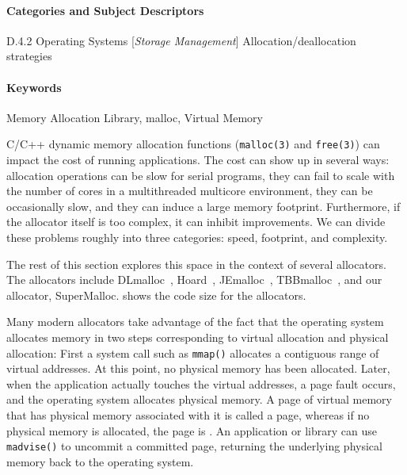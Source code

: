 \documentclass[natbib,sort&compress,10pt]{sigplanconf}
\newcommand{\code}[1]{\texttt{#1}}
\begin{document}
\paragraph{Categories and Subject Descriptors} D.4.2 Operating Systems [\textit{Storage Management}] Allocation/deallocation strategies

\paragraph{Keywords} Memory Allocation Library, malloc, Virtual Memory


C/C++ dynamic memory allocation functions (\code{malloc(3)} and
\code{free(3)}) can impact the cost of running applications.  The cost
can show up in several ways: allocation operations can be slow for
serial programs, they can fail to scale with the number of cores in a
multithreaded multicore environment, they can be occasionally slow,
and they can induce a large memory footprint.  Furthermore, if the
allocator itself is too complex, it can inhibit improvements.  We can
divide these problems roughly into three categories: speed, footprint,
and complexity. 

The rest of this section explores this space in the context of several
allocators.  The allocators include DLmalloc~\cite{Lea96},
Hoard~\cite{BergerMcBl00}, JEmalloc~\cite{Evans06},
TBBmalloc~\cite{KukanovVo07}, and our allocator, SuperMalloc.
 shows the code size for the allocators.

Many modern allocators take advantage of the fact that the operating
system allocates memory in two steps corresponding to virtual
allocation and physical allocation: First a system call such as
\code{mmap()} allocates a contiguous range of virtual addresses.  At
this point, no physical memory has been allocated.  Later, when the
application actually touches the virtual addresses, a page fault
occurs, and the operating system allocates physical memory.  A page of
virtual memory that has physical memory associated with it is called a
 page, whereas if no physical memory is allocated, the
page is .  An application or library can use
\code{madvise()} to uncommit a committed page, returning the
underlying physical memory back to the operating system.
\end{document}
